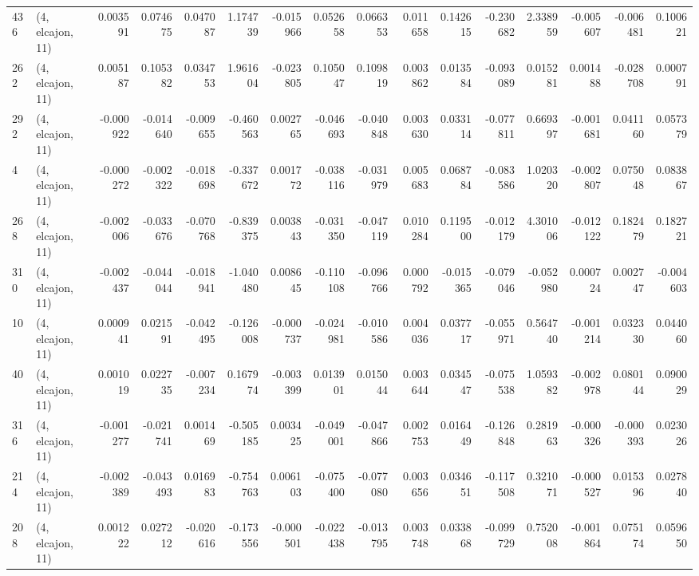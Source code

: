 \begin{tabular}{llrrrrrrrrrrrrrr}
436 &  (4, elcajon, 11) &   0.003591 &  0.074675 &  0.047087 &     1.174739 &  -0.015966 &   0.052658 &   0.066353 &  0.011658 &  0.142615 & -0.230682 &    2.338959 & -0.005607 & -0.006481 &  0.100621 \\
262 &  (4, elcajon, 11) &   0.005187 &  0.105382 &  0.034753 &     1.961604 &  -0.023805 &   0.105047 &   0.109819 &  0.003862 &  0.013584 & -0.093089 &    0.015281 &  0.001488 & -0.028708 &  0.000791 \\
292 &  (4, elcajon, 11) &  -0.000922 & -0.014640 & -0.009655 &    -0.460563 &   0.002765 &  -0.046693 &  -0.040848 &  0.003630 &  0.033114 & -0.077811 &    0.669397 & -0.001681 &  0.041160 &  0.057379 \\
4   &  (4, elcajon, 11) &  -0.000272 & -0.002322 & -0.018698 &    -0.337672 &   0.001772 &  -0.038116 &  -0.031979 &  0.005683 &  0.068784 & -0.083586 &    1.020320 & -0.002807 &  0.075048 &  0.083867 \\
268 &  (4, elcajon, 11) &  -0.002006 & -0.033676 & -0.070768 &    -0.839375 &   0.003843 &  -0.031350 &  -0.047119 &  0.010284 &  0.119500 & -0.012179 &    4.301006 & -0.012122 &  0.182479 &  0.182721 \\
310 &  (4, elcajon, 11) &  -0.002437 & -0.044044 & -0.018941 &    -1.040480 &   0.008645 &  -0.110108 &  -0.096766 &  0.000792 & -0.015365 & -0.079046 &   -0.052980 &  0.000724 &  0.002747 & -0.004603 \\
10  &  (4, elcajon, 11) &   0.000941 &  0.021591 & -0.042495 &    -0.126008 &  -0.000737 &  -0.024981 &  -0.010586 &  0.004036 &  0.037717 & -0.055971 &    0.564740 & -0.001214 &  0.032330 &  0.044060 \\
40  &  (4, elcajon, 11) &   0.001019 &  0.022735 & -0.007234 &     0.167974 &  -0.003399 &   0.013901 &   0.015044 &  0.003644 &  0.034547 & -0.075538 &    1.059382 & -0.002978 &  0.080144 &  0.090029 \\
316 &  (4, elcajon, 11) &  -0.001277 & -0.021741 &  0.001469 &    -0.505185 &   0.003425 &  -0.049001 &  -0.047866 &  0.002753 &  0.016449 & -0.126848 &    0.281963 & -0.000326 & -0.000393 &  0.023026 \\
214 &  (4, elcajon, 11) &  -0.002389 & -0.043493 &  0.016983 &    -0.754763 &   0.006103 &  -0.075400 &  -0.077080 &  0.003656 &  0.034651 & -0.117508 &    0.321071 & -0.000527 &  0.015396 &  0.027840 \\
208 &  (4, elcajon, 11) &   0.001222 &  0.027212 & -0.020616 &    -0.173556 &  -0.000501 &  -0.022438 &  -0.013795 &  0.003748 &  0.033868 & -0.099729 &    0.752008 & -0.001864 &  0.075174 &  0.059650 \\

\end{tabular}
